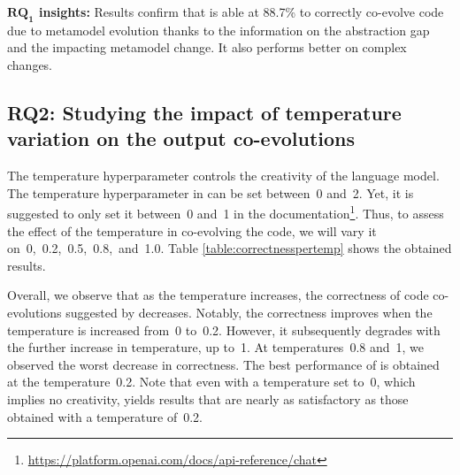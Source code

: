 \begin{tcolorbox}[boxsep=-2pt]
	\textbf{$\boldsymbol{RQ_1}$ insights:}
	Results confirm that \LLM is able at 88.7\% to correctly co-evolve code due to metamodel evolution thanks to the information on the abstraction gap and the impacting metamodel change. It also performs better on complex changes.  
\end{tcolorbox}


\subsection{RQ2: Studying the impact of temperature variation on the output co-evolutions}

The temperature hyperparameter controls the creativity of the language model. The temperature hyperparameter in \LLM can be set between~0 and~2. Yet, it is suggested to only set it between~0 and~1 in the documentation\footnote{\url{https://platform.openai.com/docs/api-reference/chat}}. Thus, to assess the effect of the temperature in co-evolving the code, we will vary it on~0,~0.2,~0.5,~0.8,~and~1.0. 
Table \ref{table:correctnesspertemp} shows the obtained results. 


Overall, we observe that as the temperature increases, the correctness of code co-evolutions suggested by \LLM decreases. Notably, the correctness improves when the temperature is increased from~0 to~0.2. However, it subsequently degrades with the further increase in temperature, up to~1. At temperatures~0.8 and~1, we observed the worst decrease in correctness. %
The best performance of \LLM is obtained at the temperature~0.2. Note that even with a temperature set to~0, which implies no creativity, \LLM yields results that are nearly as satisfactory as those obtained with a temperature of~0.2.

